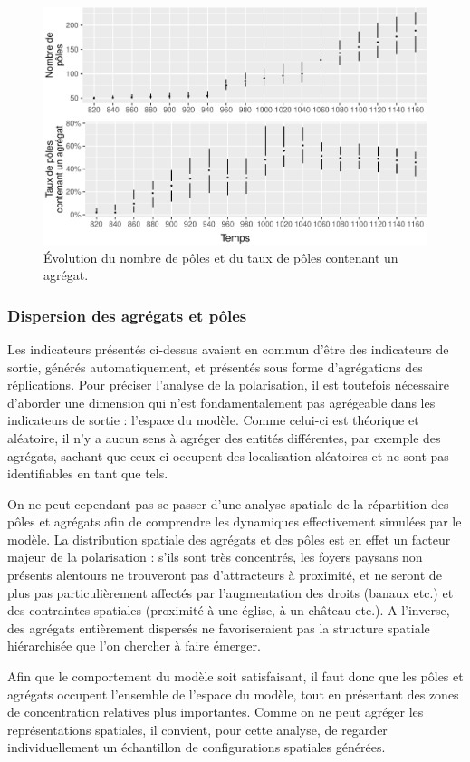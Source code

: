 \begin{figure}[H]
\captionsetup{width=\linewidth}
\includegraphics[width=0.5\linewidth]{img/resultats/v0_nombre_poles.pdf}
\caption{Évolution du nombre de pôles et du taux de pôles contenant un agrégat.}
\label{fig:nombre-poles-v0}
\end{figure}

\clearpage

\subsubsection{Dispersion des agrégats et pôles}\label{par:polarisation-dispersion}

Les indicateurs présentés ci-dessus avaient en commun d'être des indicateurs de sortie, générés automatiquement, et présentés sous forme d'agrégations des réplications.
Pour préciser l'analyse de la polarisation, il est toutefois nécessaire d'aborder une dimension qui n'est fondamentalement pas agrégeable dans les indicateurs de sortie :
l'espace du modèle.
Comme celui-ci est théorique et aléatoire, il n'y a aucun sens à agréger des entités différentes, par exemple des agrégats, sachant que ceux-ci occupent des localisation aléatoires et ne sont pas identifiables en tant que tels.

On ne peut cependant pas se passer d'une analyse spatiale de la répartition des pôles et agrégats afin de comprendre les dynamiques effectivement simulées par le modèle.
La distribution spatiale des agrégats et des pôles est en effet un facteur majeur de la polarisation :
s'ils sont très concentrés, les foyers paysans non présents alentours ne trouveront pas d'attracteurs à proximité, et ne seront de plus pas particulièrement affectés par l'augmentation des droits (banaux etc.) et des contraintes spatiales (proximité à une église, à un château etc.).
A l'inverse, des agrégats entièrement dispersés ne favoriseraient pas la structure spatiale hiérarchisée que l'on chercher à faire émerger.

Afin que le comportement du modèle soit satisfaisant, il faut donc que les pôles et agrégats occupent l'ensemble de l'espace du modèle, tout en présentant des zones de concentration relatives plus importantes.
Comme on ne peut agréger les représentations spatiales, il convient, pour cette analyse, de regarder individuellement un échantillon de configurations spatiales générées.

